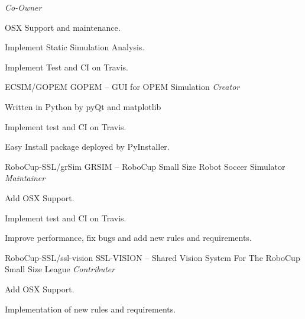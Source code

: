 \begin{cventries}
    {\textit{Co-Owner}} %
    {} %
    {
      \begin{cvitems} %
        \item {OSX Support and maintenance.}
        \item {Implement Static Simulation Analysis.}
        \item {Implement Test and CI on Travis.}
      \end{cvitems}
    }
        \newline
  \cventry
    {ECSIM/GOPEM} %
    {GOPEM -- GUI for OPEM Simulation} %
    {\textit{Creator}} %
    {} %
    {
      \begin{cvitems} %
        \item {Written in Python by pyQt and matplotlib}
        \item {Implement test and CI on Travis.}
        \item {Easy Install package deployed by PyInstaller.}
      \end{cvitems}
    }

\end{cventries}


\begin{cventries}
  \cventry
    {RoboCup-SSL/grSim} %
    {GRSIM -- RoboCup Small Size Robot Soccer Simulator } %
    {\textit{Maintainer}} %
    {} %
    {
      \begin{cvitems} %
        \item {Add OSX Support.}
        \item {Implement test and CI on Travis.}
        \item {Improve performance, fix bugs and add new rules and requirements.}
      \end{cvitems}
    }
        \newline

  \cventry
    {RoboCup-SSL/ssl-vision} %
    {SSL-VISION -- Shared Vision System For The RoboCup Small Size League} %
    {\textit{Contributer}} %
    {} %
    {
      \begin{cvitems} %
        \item {Add OSX Support.}
        \item {Implementation of new rules and requirements.}
      \end{cvitems}
    }
\end{cventries}

